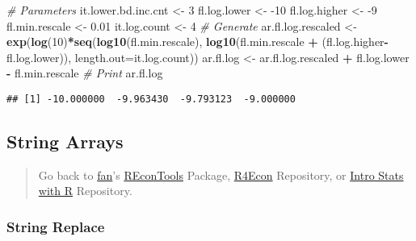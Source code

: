 \documentclass[
]{book}
\newenvironment{Shaded}{\begin{snugshade}}{\end{snugshade}}
\newcommand{\CommentTok}[1]{\textcolor[rgb]{0.56,0.35,0.01}{\textit{#1}}}
\newcommand{\DataTypeTok}[1]{\textcolor[rgb]{0.13,0.29,0.53}{#1}}
\newcommand{\DecValTok}[1]{\textcolor[rgb]{0.00,0.00,0.81}{#1}}
\newcommand{\FloatTok}[1]{\textcolor[rgb]{0.00,0.00,0.81}{#1}}
\newcommand{\KeywordTok}[1]{\textcolor[rgb]{0.13,0.29,0.53}{\textbf{#1}}}
\newcommand{\NormalTok}[1]{#1}
\newcommand{\OperatorTok}[1]{\textcolor[rgb]{0.81,0.36,0.00}{\textbf{#1}}}
\newcommand{\StringTok}[1]{\textcolor[rgb]{0.31,0.60,0.02}{#1}}
\begin{document}
\begin{Shaded}
\begin{Highlighting}[]
\CommentTok{# Parameters}
\NormalTok{it.lower.bd.inc.cnt <-}\StringTok{ }\DecValTok{3}
\NormalTok{fl.log.lower <-}\StringTok{ }\DecValTok{-10}
\NormalTok{fl.log.higher <-}\StringTok{ }\DecValTok{-9}
\NormalTok{fl.min.rescale <-}\StringTok{ }\FloatTok{0.01}
\NormalTok{it.log.count <-}\StringTok{ }\DecValTok{4}
\CommentTok{# Generate}
\NormalTok{ar.fl.log.rescaled <-}\StringTok{ }\KeywordTok{exp}\NormalTok{(}\KeywordTok{log}\NormalTok{(}\DecValTok{10}\NormalTok{)}\OperatorTok{*}\KeywordTok{seq}\NormalTok{(}\KeywordTok{log10}\NormalTok{(fl.min.rescale),}
                                      \KeywordTok{log10}\NormalTok{(fl.min.rescale }\OperatorTok{+}
\StringTok{                                              }\NormalTok{(fl.log.higher}\OperatorTok{-}\NormalTok{fl.log.lower)),}
                                      \DataTypeTok{length.out=}\NormalTok{it.log.count))}
\NormalTok{ar.fl.log <-}\StringTok{ }\NormalTok{ar.fl.log.rescaled }\OperatorTok{+}\StringTok{ }\NormalTok{fl.log.lower }\OperatorTok{-}\StringTok{ }\NormalTok{fl.min.rescale}
\CommentTok{# Print}
\NormalTok{ar.fl.log}
\end{Highlighting}
\end{Shaded}

\begin{verbatim}
## [1] -10.000000  -9.963430  -9.793123  -9.000000
\end{verbatim}

\hypertarget{string-arrays}{%
\subsection{String Arrays}\label{string-arrays}}

\begin{quote}
Go back to \href{http://fanwangecon.github.io/CodeDynaAsset/}{fan}'s \href{https://fanwangecon.github.io/REconTools/}{REconTools} Package, \href{https://fanwangecon.github.io/R4Econ/}{R4Econ} Repository, or \href{https://fanwangecon.github.io/Stat4Econ/}{Intro Stats with R} Repository.
\end{quote}

\hypertarget{string-replace}{%
\subsubsection{String Replace}\label{string-replace}}
\end{document}
